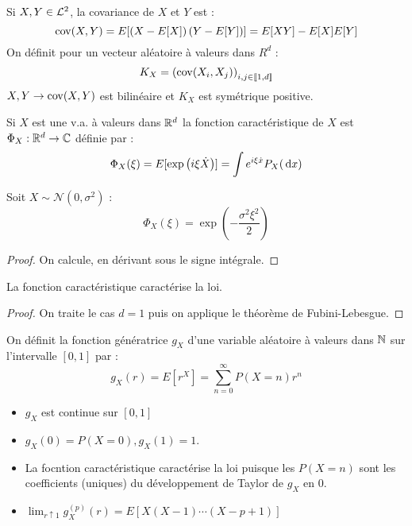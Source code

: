 \documentclass{cours}
\begin{document}
    \begin{definition}
        Si $X, Y \in \mathcal{L}^{2}$, la covariance de $X$ et $Y$ est :
        \[
            \operatorname{cov}(X, Y) = E[\left(X - E[X]\right)\left(Y - E[Y]\right)] = E[XY] - E[X]E[Y]
        \]
        On définit pour un vecteur aléatoire à valeurs dans $R^{d}$ : 
        \[
            K_{X} = \left(\operatorname{cov}(X_{i}, X_{j})\right)_{i, j \in \llbracket 1,d\rrbracket}
        \]
        $X, Y \rightarrow \operatorname{cov}(X, Y)$ est bilinéaire et $K_{X}$ est symétrique positive. 
    \end{definition}

    \begin{definition}
        Si $X$ est une v.a. à valeurs dans $\mathbb{R}^{d}$ la fonction caractéristique de $X$ est $\Phi_{X} : \mathbb{R}^{d} \rightarrow \mathbb{C}$ définie par : 
        \[
            \Phi_{X}(\xi) = E[\exp\left(i\xi \dot X\right)] = \int e^{i\xi \dot x}P_{X}({\rm \, d} x)
        \]
    \end{definition}

    \begin{lemma}
        Soit $X \sim \mathcal{N}(0, \sigma^{2})$ : 
        \[
            \Phi_{X}(\xi) = \exp\left(-\frac{\sigma^{2}\xi^{2}}{2}\right)
        \]
    \end{lemma}
    \begin{proof}
        On calcule, en dérivant sous le signe intégrale. 
    \end{proof}

    \begin{theorem}
        La fonction caractéristique caractérise la loi.
    \end{theorem}
    \begin{proof}
        On traite le cas $d = 1$ puis on applique le théorème de Fubini-Lebesgue.
    \end{proof}

    \begin{definition}
        On définit la fonction génératrice $g_{X}$ d'une variable aléatoire à valeurs dans $\mathbb{N}$ sur l'intervalle $\left[0, 1\right]$ par : 
        \[
            g_{X}(r) = E[r^{X}] = \sum_{n = 0}^{\infty}P(X = n)r^{n}
        \]
    \end{definition}

    \begin{proposition}
        \begin{itemize}
            \item $g_{X}$ est continue sur $\left[0, 1\right]$
            \item $g_{X}(0) = P(X = 0), g_{X}(1) = 1$.
            \item La focntion caractéristique caractérise la loi puisque les $P(X = n)$ sont les coefficients (uniques) du développement de Taylor de $g_{X}$ en $0$.
            \item $\lim_{r \uparrow 1}g_{X}^{(p)}(r) = E\left[X(X - 1)\cdots(X - p + 1)\right]$
        \end{itemize}
    \end{proposition}
\end{document}
